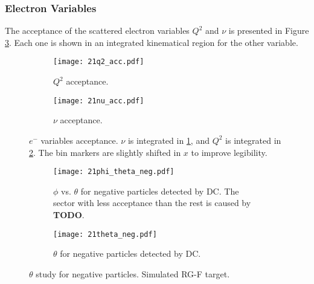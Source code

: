 \subsubsection{Electron Variables}
\label{14.21::electron_variables}
    The acceptance of the scattered electron variables $Q^2$ and $\nu$ is presented in Figure \ref{fig::14.21::electron_acc}.
    Each one is shown in an integrated kinematical region for the other variable.

    \begin{figure}[t!]
        \centering
        \begin{subfigure}[b]{\textwidth}
            \centering
            \texttt{[image: 21q2\_acc.pdf]}
            \caption{$Q^2$ acceptance.}
            \label{fig::14.21::q2_acc}
        \end{subfigure}
        \hfill
        \begin{subfigure}[b]{\textwidth}
            \centering
            \texttt{[image: 21nu\_acc.pdf]}
            \caption{$\nu$ acceptance.}
            \label{fig::14.21::nu_acc}
        \end{subfigure}
        \caption[$e^-$ variables acceptance]
        {$e^-$ variables acceptance.
        $\nu$ is integrated in \ref{fig::14.21::q2_acc}, and $Q^2$ is integrated in \ref{fig::14.21::nu_acc}.
        The bin markers are slightly shifted in $x$ to improve legibility.}
        \label{fig::14.21::electron_acc}
    \end{figure}

    \begin{figure}
        \centering
        \begin{subfigure}[b]{\textwidth}
            \centering
            \texttt{[image: 21phi\_theta\_neg.pdf]}
            \caption[$\phi$ vs. $\theta$ for negative particles]
            {$\phi$ vs. $\theta$ for negative particles detected by DC.
            The sector with less acceptance than the rest is caused by \textbf{TODO}.}
            \label{fig::14.21::phi_theta_neg}
        \end{subfigure}
        \begin{subfigure}[b]{\textwidth}
            \centering
            \texttt{[image: 21theta\_neg.pdf]}
            \caption[$\theta$ for negative particles]
            {$\theta$ for negative particles detected by DC.}
            \label{fig::14.21::theta_neg}
        \end{subfigure}
        \caption[$\theta$ study for negative particles]
        {$\theta$ study for negative particles.
        Simulated RG-F target.}
        \label{fig::14.21::theta_study_neg}
    \end{figure}

